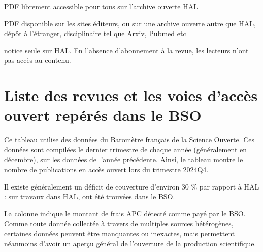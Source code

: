 \documentclass[french, 11pt]{dibiso/biso}
\begin{document}
{\footnotesize\openaccessworksinfo}

\begin{tcolorbox}[colback=white, arc=4pt, boxrule=0.5pt, left=2pt, right=2pt, top=2pt, bottom=2pt]
\footnotesize
\begin{description}[leftmargin=!, labelwidth=\widthof{\bfseries OA Hors HAL}]
    \item[TI dans HAL] PDF librement accessible pour tous sur l'archive ouverte HAL
    \item[OA Hors HAL] PDF disponible sur les sites éditeurs, ou sur une archive ouverte autre que HAL, dépôt à l'étranger, disciplinaire tel que Arxiv, Pubmed etc
    \item[Accès fermé] notice seule sur HAL. En l'absence d'abonnement à la revue, les lecteurs n'ont pas accès au contenu.
\end{description}
\end{tcolorbox}

\bigskip







\pagebreak


\section[Version bêta]{Liste des revues et les voies d'accès ouvert repérés dans le BSO}

Ce tableau utilise des données du Baromètre français de la Science Ouverte. Ces données sont compilées le dernier trimestre de chaque année (généralement en décembre), sur les données de l'année précédente. Ainsi, le tableau montre le nombre de publications en accès ouvert lors du trimestre 2024Q4.

Il existe généralement un déficit de couverture d'environ 30 \% par rapport à HAL : sur {\bsojournalsnbworks} travaux dans HAL, {\bsojournalsnbworksfoundinbso} ont été trouvées dans le BSO.

La colonne  indique le montant de frais APC détecté comme payé par le BSO. Comme toute donnée collectée à travers de multiples sources hétérogènes, certaines données peuvent être manquantes ou inexactes, mais permettent néanmoins d'avoir un aperçu général de l'ouverture de la production scientifique.
\end{document}
